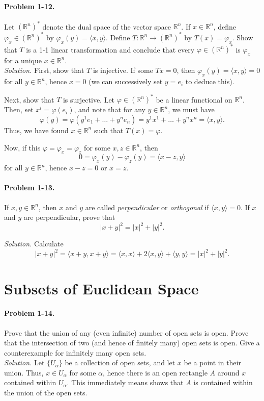 \documentclass[11pt]{report}
\newcommand{\R}{\mathbb{R}}
\newcommand{\ip}[2]{\langle #1, #2 \rangle}
\newcommand{\problem}[1]{\paragraph{Problem #1.}}
\newcommand{\solution}{\noindent\textit{Solution.} }
\begin{document}
    \problem{1-12} Let $(\R^n)^*$ denote the dual space of the vector space $\R^n$.
    If $x \in \R^n$, define $\varphi_x \in (\R^n)^*$ by $\varphi_x(y) = \ip{x}{y}$.
    Define $T\colon \R^n \to (\R^n)^*$ by $T(x) = \varphi_x$. Show that $T$ is a 1-1
    linear transformation and conclude that every $\varphi \in (\R^n)^*$ is
    $\varphi_x$ for a unique $x \in \R^n$. \\

    \solution First, show that $T$ is injective. If some $Tx = 0$, then $\varphi_x(y)
    = \ip{x}{y} = 0$ for all $y \in \R^n$, hence $x = 0$ (we can successively set $y
    = e_i$ to deduce this).

    Next, show that $T$ is surjective. Let $\varphi \in (\R^n)^*$ be a linear
    functional on $\R^n$. Then, set $x^i = \varphi(e_i)$, and note that for any $y
    \in \R^n$, we must have \[
        \varphi(y) = \varphi(y^1e_1 + \dots + y^ne_n) = y^1x^1 + \dots + y^nx^n =
        \ip{x}{y}.
    \] Thus, we have found $x \in \R^n$ such that $T(x) = \varphi$.

    Now, if this $\varphi = \varphi_x = \varphi_z$ for some $x, z \in \R^n$, then \[
        0 = \varphi_x(y) - \varphi_z(y) = \ip{x - z}{y}
    \] for all $y \in \R^n$, hence $x - z = 0$ or $x = z$.


    \problem{1-13} If $x, y \in \R^n$, then $x$ and $y$ are called
    \emph{perpendicular} or \emph{orthogonal} if $\ip{x}{y} = 0$. If $x$ and $y$ are
    perpendicular, prove that \[
        |x + y|^2 = |x|^2 + |y|^2.
    \] 

    \solution Calculate \[
        |x + y|^2 = \ip{x + y}{x + y} = \ip{x}{x} + 2\ip{x}{y} + \ip{y}{y} = |x|^2 +
        |y|^2.
    \] 



    \section{Subsets of Euclidean Space}

    \problem{1-14} Prove that the union of any (even infinite) number of open sets is
    open. Prove that the intersection of two (and hence of finitely many) open sets
    is open. Give a counterexample for infinitely many open sets. \\

    \solution Let $\{U_\alpha\}$ be a collection of open sets, and let $x$ be a point
    in their union. Thus, $x \in U_\alpha$ for some $\alpha$, hence there is an open
    rectangle $A$ around $x$ contained within $U_\alpha$. This immediately means
    shows that $A$ is contained within the union of the open sets.
\end{document}
